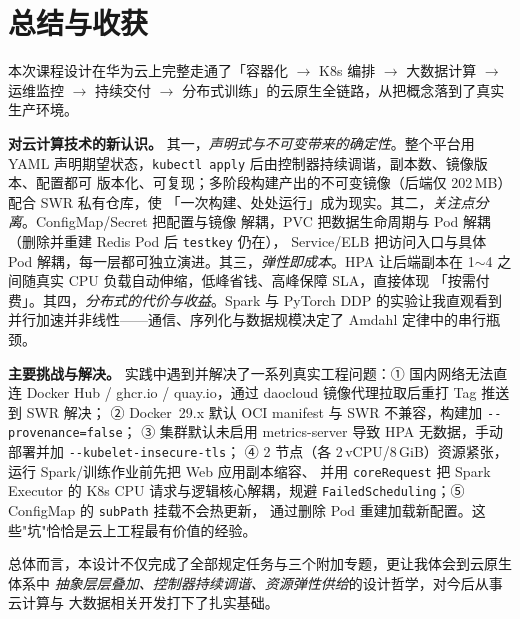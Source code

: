 \chapter{总结与收获}

本次课程设计在华为云上完整走通了「容器化 $\to$ K8s 编排 $\to$ 大数据计算 $\to$ 运维监控
$\to$ 持续交付 $\to$ 分布式训练」的云原生全链路，从把概念落到了真实生产环境。

\textbf{对云计算技术的新认识。} 其一，\emph{声明式与不可变带来的确定性}。整个平台用 YAML
声明期望状态，\lstinline!kubectl apply! 后由控制器持续调谐，副本数、镜像版本、配置都可
版本化、可复现；多阶段构建产出的不可变镜像（后端仅 202\,MB）配合 SWR 私有仓库，使
「一次构建、处处运行」成为现实。其二，\emph{关注点分离}。ConfigMap/Secret 把配置与镜像
解耦，PVC 把数据生命周期与 Pod 解耦（删除并重建 Redis Pod 后 \lstinline!testkey! 仍在），
Service/ELB 把访问入口与具体 Pod 解耦，每一层都可独立演进。其三，\emph{弹性即成本}。HPA
让后端副本在 1$\sim$4 之间随真实 CPU 负载自动伸缩，低峰省钱、高峰保障 SLA，直接体现
「按需付费」。其四，\emph{分布式的代价与收益}。Spark 与 PyTorch DDP 的实验让我直观看到
并行加速并非线性——通信、序列化与数据规模决定了 Amdahl 定律中的串行瓶颈。

\textbf{主要挑战与解决。} 实践中遇到并解决了一系列真实工程问题：① 国内网络无法直连
Docker Hub / ghcr.io / quay.io，通过 daocloud 镜像代理拉取后重打 Tag 推送到 SWR 解决；
② Docker~29.x 默认 OCI manifest 与 SWR 不兼容，构建加 \lstinline!--provenance=false!；
③ 集群默认未启用 metrics-server 导致 HPA 无数据，手动部署并加 \lstinline!--kubelet-insecure-tls!；
④ 2 节点（各 2\,vCPU/8\,GiB）资源紧张，运行 Spark/训练作业前先把 Web 应用副本缩容、
并用 \lstinline!coreRequest! 把 Spark Executor 的 K8s CPU 请求与逻辑核心解耦，规避
\lstinline!FailedScheduling!；⑤ ConfigMap 的 \lstinline!subPath! 挂载不会热更新，
通过删除 Pod 重建加载新配置。这些"坑"恰恰是云上工程最有价值的经验。

总体而言，本设计不仅完成了全部规定任务与三个附加专题，更让我体会到云原生体系中
\emph{抽象层层叠加、控制器持续调谐、资源弹性供给}的设计哲学，对今后从事云计算与
大数据相关开发打下了扎实基础。
